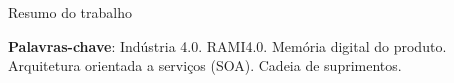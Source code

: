 \imprimircapa


\imprimirfolhaderosto

\begin{fichacatalografica}
	
\end{fichacatalografica}

%	
%		
%		
%	
%	
%	
%	

\setlength{\absparsep}{18pt} %
\begin{resumo}
	Resumo do trabalho
	
	\vspace{\onelineskip}
	
	\noindent
	\textbf{Palavras-chave}: Indústria 4.0. RAMI4.0. Memória digital do produto. Arquitetura orientada a serviços (SOA). Cadeia de suprimentos.
\end{resumo}

